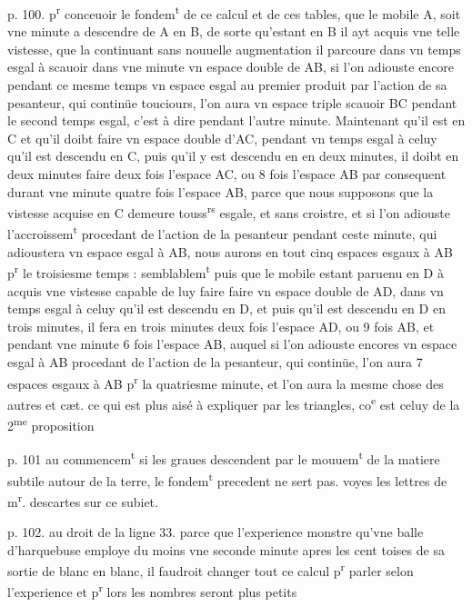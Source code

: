 \documentclass[11pt,a4paper]{article}
\begin{document}
p. 100.
p\textsuperscript{r} conceuoir le fondem\textsuperscript{t} de ce calcul et de ces tables, que le mobile A, soit vne minute a descendre de A en B, de sorte qu'estant en B il ayt acquis vne telle vistesse, que la continuant sans nouuelle augmentation il parcoure dans vn temps esgal à scauoir dans vne minute vn espace double de AB, si l'on adiouste encore pendant ce mesme temps vn espace esgal au premier produit par l'action de sa pesanteur, qui continüe touciours, l'on aura vn espace triple scauoir BC pendant le second temps esgal, c'est à dire pendant l'autre minute. Maintenant qu'il est en C et qu'il doibt faire vn espace double d'AC, pendant vn temps esgal à celuy qu'il est descendu en C, puis qu'il y est descendu en en deux minutes, il doibt en deux minutes faire deux fois l'espace AC, ou 8 fois l'espace AB par consequent durant vne minute quatre fois l'espace AB, parce que nous supposons que la vistesse acquise en C demeure touss\textsuperscript{rs} esgale, et sans croistre, et si l'on adiouste l'accroissem\textsuperscript{t} procedant de l'action de la pesanteur pendant ceste minute, qui adioustera vn espace esgal à AB, nous aurons en tout cinq espaces esgaux à AB p\textsuperscript{r} le troisiesme temps : semblablem\textsuperscript{t} puis que le mobile estant paruenu en D à acquis vne vistesse capable de luy faire faire vn espace double de AD, dans vn temps esgal à celuy qu'il est descendu en D, et puis qu'il est descendu en D en trois minutes, il fera en trois minutes deux fois l'espace AD, ou 9 fois AB, et pendant vne minute 6 fois  l'espace AB, auquel si l'on adiouste encores vn espace esgal à AB procedant de l'action de la pesanteur, qui continüe, l'on aura 7 espaces esgaux à AB p\textsuperscript{r} la quatriesme minute, et l'on aura la mesme chose des autres et cæt. ce qui est plus aisé à expliquer par les triangles, co\textsuperscript{e} est celuy de la 2\textsuperscript{me} proposition

p. 101 au commencem\textsuperscript{t}
si les graues descendent par le mouuem\textsuperscript{t} de la matiere subtile autour de la terre, le fondem\textsuperscript{t} precedent ne sert pas. voyes les lettres de m\textsuperscript{r}. descartes sur ce subiet.


p. 102. au droit de la ligne 33.
parce que l'experience monstre qu'vne balle d'harquebuse employe du moins vne seconde minute apres les cent toises de sa sortie de blanc en blanc, il faudroit changer tout ce calcul p\textsuperscript{r} parler selon l'experience et p\textsuperscript{r} lors les nombres seront plus petits
\end{document}
